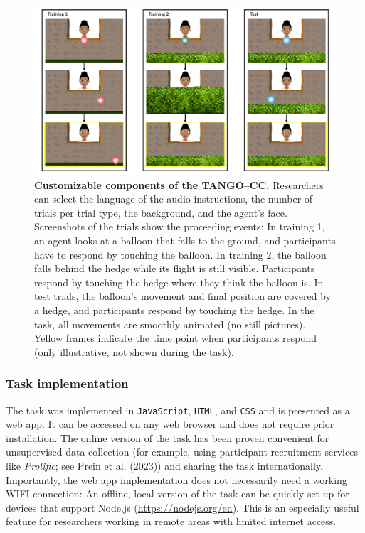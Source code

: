\documentclass[
  man,floatsintext]{apa7}
\begin{document}
\begin{figure}

{\centering \includegraphics[width=1\linewidth]{../figures/TANGO-CC-procedure} 

}

\caption{\textbf{Customizable components of the TANGO--CC.} Researchers can select the language of the audio instructions, the number of trials per trial type, the background, and the agent's face. Screenshots of the trials show the proceeding events: In training 1, an agent looks at a balloon that falls to the ground, and participants have to respond by touching the balloon. In training 2, the balloon falls behind the hedge while its flight is still visible. Participants respond by touching the hedge where they think the balloon is. In test trials, the balloon's movement and final position are covered by a hedge, and participants respond by touching the hedge. In the task, all movements are smoothly animated (no still pictures). Yellow frames indicate the time point when participants respond (only illustrative, not shown during the task).}\label{fig:fig1}
\end{figure}

\subsubsection{Task implementation}\label{task-implementation}

The task was implemented in \texttt{JavaScript}, \texttt{HTML}, and \texttt{CSS} and is presented as a web app.
It can be accessed on any web browser and does not require prior installation.
The online version of the task has been proven convenient for unsupervised data collection (for example, using participant recruitment services like \emph{Prolific}; see Prein et al. (2023)) and sharing the task internationally.
Importantly, the web app implementation does not necessarily need a working WIFI connection: An offline, local version of the task can be quickly set up for devices that support Node.js (\url{https://nodejs.org/en}).
This is an especially useful feature for researchers working in remote areas with limited internet access.
\end{document}
